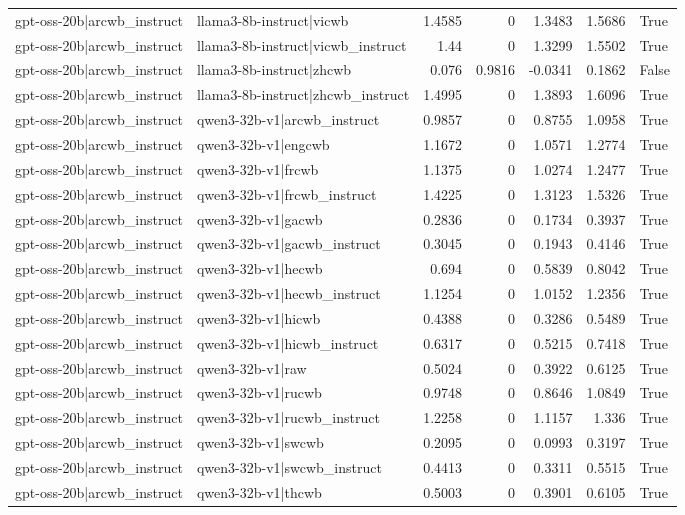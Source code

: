 \begin{table}
\begin{tabular}{l l r r r r l}
gpt-oss-20b|arcwb_instruct & llama3-8b-instruct|vicwb & 1.4585 & 0 & 1.3483 & 1.5686 & True \\
gpt-oss-20b|arcwb_instruct & llama3-8b-instruct|vicwb_instruct & 1.44 & 0 & 1.3299 & 1.5502 & True \\
gpt-oss-20b|arcwb_instruct & llama3-8b-instruct|zhcwb & 0.076 & 0.9816 & -0.0341 & 0.1862 & False \\
gpt-oss-20b|arcwb_instruct & llama3-8b-instruct|zhcwb_instruct & 1.4995 & 0 & 1.3893 & 1.6096 & True \\
gpt-oss-20b|arcwb_instruct & qwen3-32b-v1|arcwb_instruct & 0.9857 & 0 & 0.8755 & 1.0958 & True \\
gpt-oss-20b|arcwb_instruct & qwen3-32b-v1|engcwb & 1.1672 & 0 & 1.0571 & 1.2774 & True \\
gpt-oss-20b|arcwb_instruct & qwen3-32b-v1|frcwb & 1.1375 & 0 & 1.0274 & 1.2477 & True \\
gpt-oss-20b|arcwb_instruct & qwen3-32b-v1|frcwb_instruct & 1.4225 & 0 & 1.3123 & 1.5326 & True \\
gpt-oss-20b|arcwb_instruct & qwen3-32b-v1|gacwb & 0.2836 & 0 & 0.1734 & 0.3937 & True \\
gpt-oss-20b|arcwb_instruct & qwen3-32b-v1|gacwb_instruct & 0.3045 & 0 & 0.1943 & 0.4146 & True \\
gpt-oss-20b|arcwb_instruct & qwen3-32b-v1|hecwb & 0.694 & 0 & 0.5839 & 0.8042 & True \\
gpt-oss-20b|arcwb_instruct & qwen3-32b-v1|hecwb_instruct & 1.1254 & 0 & 1.0152 & 1.2356 & True \\
gpt-oss-20b|arcwb_instruct & qwen3-32b-v1|hicwb & 0.4388 & 0 & 0.3286 & 0.5489 & True \\
gpt-oss-20b|arcwb_instruct & qwen3-32b-v1|hicwb_instruct & 0.6317 & 0 & 0.5215 & 0.7418 & True \\
gpt-oss-20b|arcwb_instruct & qwen3-32b-v1|raw & 0.5024 & 0 & 0.3922 & 0.6125 & True \\
gpt-oss-20b|arcwb_instruct & qwen3-32b-v1|rucwb & 0.9748 & 0 & 0.8646 & 1.0849 & True \\
gpt-oss-20b|arcwb_instruct & qwen3-32b-v1|rucwb_instruct & 1.2258 & 0 & 1.1157 & 1.336 & True \\
gpt-oss-20b|arcwb_instruct & qwen3-32b-v1|swcwb & 0.2095 & 0 & 0.0993 & 0.3197 & True \\
gpt-oss-20b|arcwb_instruct & qwen3-32b-v1|swcwb_instruct & 0.4413 & 0 & 0.3311 & 0.5515 & True \\
gpt-oss-20b|arcwb_instruct & qwen3-32b-v1|thcwb & 0.5003 & 0 & 0.3901 & 0.6105 & True \\

\end{tabular}
\end{table}
